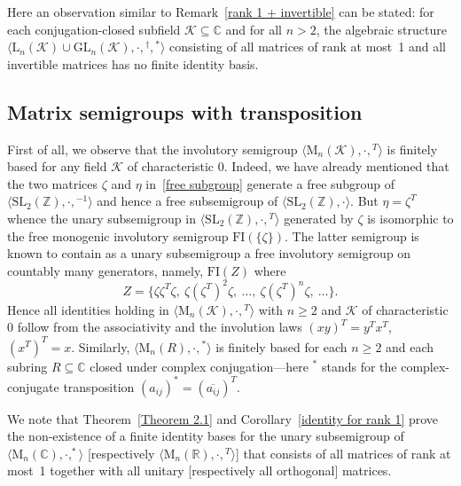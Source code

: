 \documentclass[11pt,reqno]{amsart}
\numberwithin{equation}{section}
\def\bb{\mathbb}
\theoremstyle{remark}
\def\ol{\overline}
\begin{document}
Here an observation similar to Remark~\ref{rank 1 + invertible}
can be stated: for each con\-jugation-closed subfield
$\mathcal{K}\subseteq\bb C$ and for all $n>2$, the algebraic
structure
$\langle\mathrm{L}_n(\mathcal{K})\cup\mathrm{GL}_n(\mathcal{K}),\cdot,{}^\dag,{}^*\rangle$
consisting of all matrices of rank at most~1 and all invertible
matrices has no finite identity basis.


\subsection{Matrix semigroups with transposition}
First of all, we observe that the involutory semigroup $\langle\mathrm{M}_n(\mathcal{K}),\cdot,{}^T\rangle$ is finitely
based for any field $\mathcal{K}$ of characteristic $0$. Indeed, we have already mentioned that the two matrices
$\zeta$ and $\eta$ in~\eqref{free subgroup} generate a free subgroup of $\langle\mathrm{SL}_2(\bb
Z),\cdot,{}^{-1}\rangle$ and hence a free subsemigroup of $\langle\mathrm{SL}_2(\bb Z), \cdot\rangle$. But
$\eta=\zeta^T$ whence the unary subsemigroup in $\langle\mathrm{SL}_2(\bb Z),\cdot,{}^T\rangle$ generated by $\zeta$ is
isomorphic to the free monogenic involutory semigroup $\mathrm{FI}(\{\zeta\})$. The latter semigroup is known to
contain as a unary subsemigroup a free involutory semigroup on countably many generators, namely, $\mathrm{FI}(Z)$
where
$$Z=\{\zeta \zeta ^T\zeta ,\ \zeta (\zeta ^T)^2\zeta ,\ \dots,\ \zeta (\zeta ^T)^n\zeta ,\ \dots\}.$$
Hence all identities holding in
$\langle\mathrm{M}_n(\mathcal{K}),\cdot,{}^T\rangle$ with $n\ge 2$
and $\mathcal{K}$ of characteristic $0$ follow from the
associativity and the involution laws $(xy)^T = y^Tx^T$, $(x^T)^T
= x$. Similarly, $\langle\mathrm{M}_n(R),\cdot,{}^*\rangle$ is
finitely based for each $n \ge 2$ and each subring $R\subseteq \bb
C$ closed under complex conjugation---here ${}^*$ stands for the
complex-conjugate transposition $(a_{ij})^*= (\ol{a_{ij}})^T$.

We note that Theorem~\ref{Theorem 2.1} and Corollary~\ref{identity
for rank 1} prove the non-existence of a finite identity bases for
the unary subsemigroup of $\langle\mathrm{M}_n(\bb
C),\cdot,^*\rangle$ [respectively $\langle\mathrm{M}_n(\bb
R),\cdot,{}^T\rangle$] that consists of all matrices of rank at
most~1 together with all unitary [respectively all orthogonal]
matrices.
\end{document}
